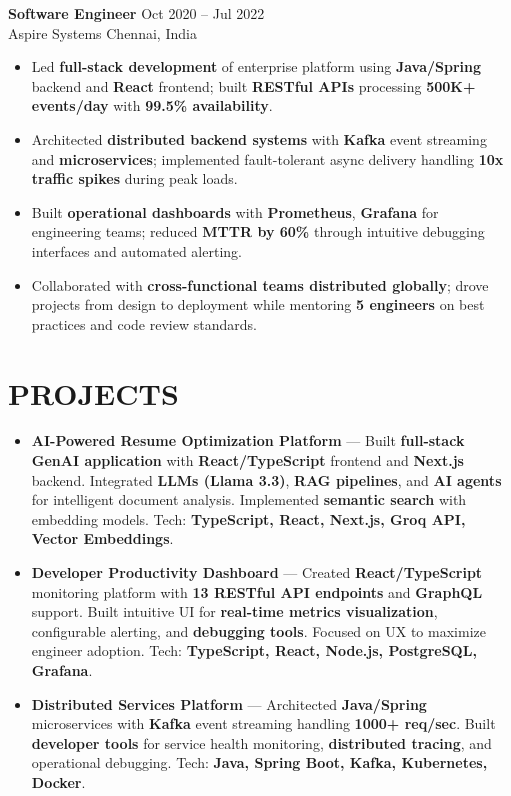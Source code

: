 \documentclass[letterpaper,10pt]{article}
\newcommand{\resumeItem}[1]{\item\small #1}
\newcommand{\resumeSubheading}[4]{
  \vspace{6pt}
  \noindent
  \textbf{#1} \hfill {\footnotesize #2} \\
  [-1pt]
  \noindent
  \small #3 \hfill {\small #4}
  \vspace{3pt}
}
\newcommand{\resumeItemsStart}{\vspace{-2pt}\begin{itemize}}
\newcommand{\resumeItemsEnd}{\end{itemize}\vspace{6pt}}
\begin{document}
\resumeSubheading
{Software Engineer}{Oct 2020 -- Jul 2022}
{Aspire Systems}{Chennai, India}
\resumeItemsStart
\resumeItem{Led \textbf{full-stack development} of enterprise platform using \textbf{Java/Spring} backend and \textbf{React} frontend; built \textbf{RESTful APIs} processing \textbf{500K+ events/day} with \textbf{99.5\% availability}.}
\resumeItem{Architected \textbf{distributed backend systems} with \textbf{Kafka} event streaming and \textbf{microservices}; implemented fault-tolerant async delivery handling \textbf{10x traffic spikes} during peak loads.}
\resumeItem{Built \textbf{operational dashboards} with \textbf{Prometheus}, \textbf{Grafana} for engineering teams; reduced \textbf{MTTR by 60\%} through intuitive debugging interfaces and automated alerting.}
\resumeItem{Collaborated with \textbf{cross-functional teams distributed globally}; drove projects from design to deployment while mentoring \textbf{5 engineers} on best practices and code review standards.}
\resumeItemsEnd
\vspace{-8pt}


\section{\textcolor{metablue}{PROJECTS}}
\vspace{-5pt}
\begin{tcolorbox}[colback=white,colframe=metablue,boxrule=0.8pt,arc=2pt,left=4pt,right=4pt,top=2pt,bottom=2pt]
\begin{itemize}
\resumeItem{\textbf{AI-Powered Resume Optimization Platform} --- Built \textbf{full-stack GenAI application} with \textbf{React/TypeScript} frontend and \textbf{Next.js} backend. Integrated \textbf{LLMs (Llama 3.3)}, \textbf{RAG pipelines}, and \textbf{AI agents} for intelligent document analysis. Implemented \textbf{semantic search} with embedding models. Tech: \textbf{TypeScript, React, Next.js, Groq API, Vector Embeddings}.}

\resumeItem{\textbf{Developer Productivity Dashboard} --- Created \textbf{React/TypeScript} monitoring platform with \textbf{13 RESTful API endpoints} and \textbf{GraphQL} support. Built intuitive UI for \textbf{real-time metrics visualization}, configurable alerting, and \textbf{debugging tools}. Focused on UX to maximize engineer adoption. Tech: \textbf{TypeScript, React, Node.js, PostgreSQL, Grafana}.}

\resumeItem{\textbf{Distributed Services Platform} --- Architected \textbf{Java/Spring} microservices with \textbf{Kafka} event streaming handling \textbf{1000+ req/sec}. Built \textbf{developer tools} for service health monitoring, \textbf{distributed tracing}, and operational debugging. Tech: \textbf{Java, Spring Boot, Kafka, Kubernetes, Docker}.}

\end{itemize}
\end{tcolorbox}
\vspace{-5pt}
\end{document}
